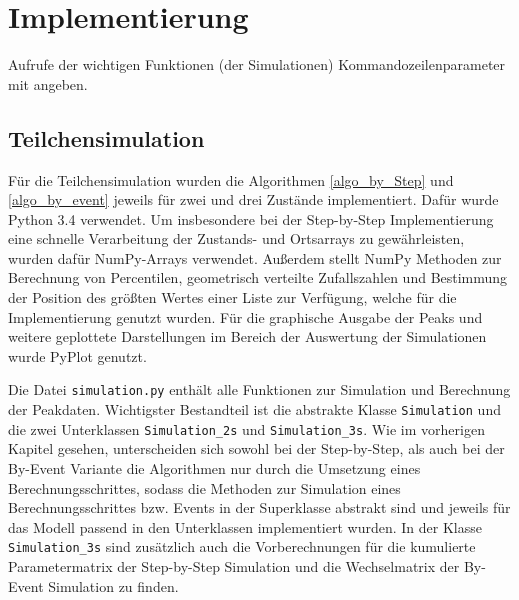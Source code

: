 
\chapter{Implementierung}
\label{chapter:imp}

Aufrufe der wichtigen Funktionen (der Simulationen) Kommandozeilenparameter mit angeben. 


\section{Teilchensimulation}
Für die Teilchensimulation wurden die Algorithmen \ref{algo_by_Step} und \ref{algo_by_event} jeweils für zwei und drei Zustände implementiert. Dafür wurde Python 3.4 verwendet. 
Um insbesondere bei der Step-by-Step Implementierung eine schnelle Verarbeitung der Zustands- und Ortsarrays zu gewährleisten, wurden dafür NumPy-Arrays verwendet. Außerdem stellt NumPy Methoden zur Berechnung von Percentilen, geometrisch verteilte Zufallszahlen und Bestimmung der Position des größten Wertes einer Liste zur Verfügung, welche für die Implementierung genutzt wurden.
Für die graphische Ausgabe der Peaks und weitere geplottete Darstellungen im Bereich der Auswertung der Simulationen wurde PyPlot genutzt.


Die Datei \texttt{simulation.py} enthält alle Funktionen zur Simulation und Berechnung der Peakdaten. Wichtigster Bestandteil ist die abstrakte Klasse \texttt{Simulation} und die zwei Unterklassen \texttt{Simulation\_2s} und \texttt{Simulation\_3s}. Wie im vorherigen Kapitel gesehen, unterscheiden sich sowohl bei der Step-by-Step, als auch bei der By-Event Variante die Algorithmen nur durch die Umsetzung eines Berechnungsschrittes, sodass die Methoden zur Simulation eines Berechnungsschrittes bzw. Events in der Superklasse abstrakt sind und jeweils für das Modell passend in den Unterklassen implementiert wurden. In der Klasse \verb!Simulation_3s! sind zusätzlich auch die Vorberechnungen für die kumulierte Parametermatrix der Step-by-Step Simulation und die Wechselmatrix der By-Event Simulation zu finden.

